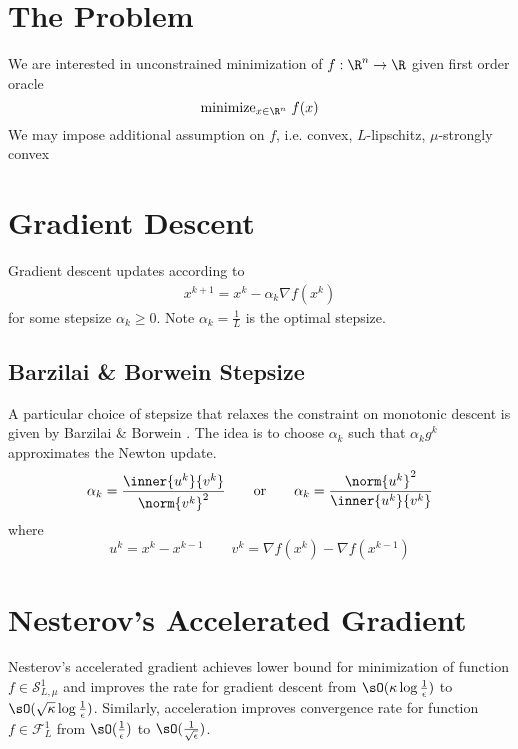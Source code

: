 \documentclass[11pt]{article}
\newcommand\scrF{\ensuremath{\mathscr{F}}}
\newcommand\scrS{\ensuremath{\mathscr{S}}}
\begin{document}
 

\section{The Problem}

We are interested in unconstrained minimization of $f:\R^n \to \R$ given first order oracle
\[
    \text{minimize}_{x\in\R^n}\; f(x)
\]
We may impose additional assumption on $f$, i.e. convex, $L$-lipschitz, $\mu$-strongly convex

\section{Gradient Descent}

Gradient descent updates according to 
\begin{align*}
    x^{k+1} = x^k - \alpha_k \nabla f(x^k)
\end{align*}
for some stepsize $\alpha_k \geq 0$. Note $\alpha_k = \frac{1}{L}$ is the optimal stepsize.

\subsection{Barzilai \& Borwein Stepsize}

A particular choice of stepsize that relaxes the constraint on monotonic descent is given by Barzilai \& Borwein \cite{barzilaiTwoPointStepSize1988}. The idea is to choose $\alpha_k$ such that $\alpha_k g^k$ approximates the Newton update.
\begin{align*}
    \alpha_k = \frac{\inner{u^k}{v^k}}{\norm{v^k}^2}
    \quad\quad\text{or}\quad\quad
    \alpha_k = \frac{\norm{u^k}^2}{\inner{u^k}{v^k}}
\end{align*}
where 
\[
    u^k = x^k - x^{k-1}
    \quad\quad
    v^k = \nabla f(x^k) - \nabla f(x^{k-1})
\]

\section{Nesterov's Accelerated Gradient}

Nesterov's accelerated gradient achieves lower bound for minimization of function $f\in \scrS_{L,\mu}^1$ and improves the rate for gradient descent from $\sO(\kappa\log \frac{1}{\epsilon})$ to $\sO(\sqrt{\kappa}\log \frac{1}{\epsilon})$. Similarly, acceleration improves convergence rate for function $ f\in\scrF_{L}^1$ from $\sO(\frac{1}{\epsilon})$ to $\sO(\frac{1}{\sqrt{\epsilon}})$.
\end{document}
